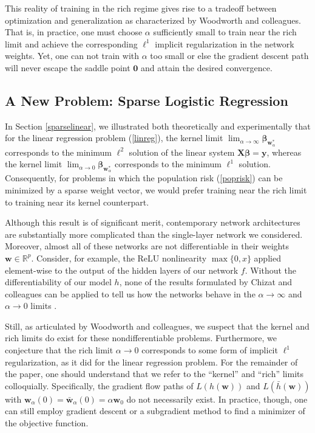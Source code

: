 \documentclass{article}
\begin{document}
This reality of training in the rich regime gives rise to a tradeoff between optimization and generalization as characterized by Woodworth and colleagues. That is, in practice, one must choose $\alpha$ sufficiently small to train near the rich limit and achieve the corresponding $\ell^1$ implicit regularization in the network weights. Yet, one can not train with $\alpha$ too small or else the gradient descent path will never escape the saddle point $\boldsymbol{0}$ and attain the desired convergence.

\subsection{A New Problem: Sparse Logistic Regression}\label{sparselogistic}
In Section \ref{sparselinear}, we illustrated both theoretically and experimentally that for the linear regression problem (\ref{linreg}), the kernel limit $\lim_{\alpha \to \infty}\boldsymbol{\beta}_{\boldsymbol{w}_{\alpha}^*}$ corresponds to the minimum $\ell^2$ solution of the linear system $\boldsymbol{X} \boldsymbol{\beta} = \boldsymbol{y}$, whereas the kernel limit $\lim_{\alpha \to 0}\boldsymbol{\beta}_{\boldsymbol{w}_{\alpha}^*}$ corresponds to the minimum $\ell^1$ solution. Consequently, for problems in which the population risk (\ref{poprisk}) can be minimized by a sparse weight vector, we would prefer training near the rich limit to training near its kernel counterpart. 

Although this result is of significant merit, contemporary network architectures are substantially more complicated than the single-layer network we considered. Moreover, almost all of these networks are not differentiable in their weights $\boldsymbol{w} \in \mathbb{R}^p$. Consider, for example, the ReLU nonlinearity $\max\{0, x \}$ applied element-wise to the output of the hidden layers of our network $f$. Without the differentiability of our model $h$, none of the results formulated by Chizat and colleagues can be applied to tell us how the networks behave in the $\alpha \rightarrow \infty$ and $\alpha \rightarrow 0$ limits \cite{chizat2018note}. 

Still, as articulated by Woodworth and colleagues, we suspect that the kernel and rich limits do exist for these nondifferentiable problems. Furthermore, we conjecture that the rich limit $\alpha \rightarrow 0$ corresponds to some form of implicit $\ell^1$ regularization, as it did for the linear regression problem. For the remainder of the paper, one should understand that we refer to the \enquote{kernel} and \enquote{rich} limits colloquially. Specifically, the gradient flow paths of $L(h(\boldsymbol{w}))$ and $L(\bar{h}(\boldsymbol{w}))$ with $\boldsymbol{w}_{\alpha}(0) = \boldsymbol{\bar{w}}_{\alpha}(0) = \alpha \boldsymbol{w}_0$ do not necessarily exist. In practice, though, one can still employ gradient descent or a subgradient method to find a minimizer of the objective function. 
\end{document}
